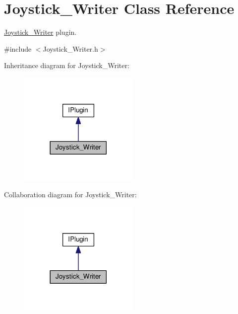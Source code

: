 \hypertarget{class_joystick___writer}{}\section{Joystick\+\_\+\+Writer Class Reference}
\label{class_joystick___writer}


\hyperlink{class_joystick___writer}{Joystick\+\_\+\+Writer} plugin.  




{\ttfamily \#include $<$Joystick\+\_\+\+Writer.\+h$>$}



Inheritance diagram for Joystick\+\_\+\+Writer\+:\nopagebreak
\begin{figure}[H]
\begin{center}
\leavevmode
\includegraphics[width=165pt]{class_joystick___writer__inherit__graph}
\end{center}
\end{figure}


Collaboration diagram for Joystick\+\_\+\+Writer\+:\nopagebreak
\begin{figure}[H]
\begin{center}
\leavevmode
\includegraphics[width=165pt]{class_joystick___writer__coll__graph}
\end{center}
\end{figure}
